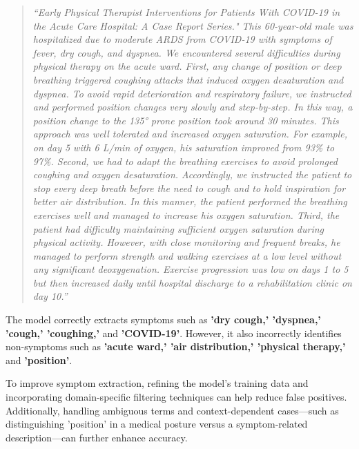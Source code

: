 \begin{quote}
\textit{“Early Physical Therapist Interventions for Patients With COVID-19 in the Acute Care Hospital: A Case Report Series." This 60-year-old male was hospitalized due to moderate ARDS from COVID-19 with symptoms of fever, dry cough, and dyspnea. We encountered several difficulties during physical therapy on the acute ward. First, any change of position or deep breathing triggered coughing attacks that induced oxygen desaturation and dyspnea. To avoid rapid deterioration and respiratory failure, we instructed and performed position changes very slowly and step-by-step. In this way, a position change to the 135° prone position took around 30 minutes. This approach was well tolerated and increased oxygen saturation. For example, on day 5 with 6 L/min of oxygen, his saturation improved from 93\% to 97\%. Second, we had to adapt the breathing exercises to avoid prolonged coughing and oxygen desaturation. Accordingly, we instructed the patient to stop every deep breath before the need to cough and to hold inspiration for better air distribution. In this manner, the patient performed the breathing exercises well and managed to increase his oxygen saturation. Third, the patient had difficulty maintaining sufficient oxygen saturation during physical activity. However, with close monitoring and frequent breaks, he managed to perform strength and walking exercises at a low level without any significant deoxygenation. Exercise progression was low on days 1 to 5 but then increased daily until hospital discharge to a rehabilitation clinic on day 10.”}
\end{quote}

The model correctly extracts symptoms such as \textbf{'dry cough,' 'dyspnea,' 'cough,' 'coughing,'} and \textbf{'COVID-19'}. However, it also incorrectly identifies non-symptoms such as \textbf{'acute ward,' 'air distribution,' 'physical therapy,'} and \textbf{'position'}. 

To improve symptom extraction, refining the model's training data and incorporating domain-specific filtering techniques can help reduce false positives. Additionally, handling ambiguous terms and context-dependent cases—such as distinguishing 'position' in a medical posture versus a symptom-related description—can further enhance accuracy.

